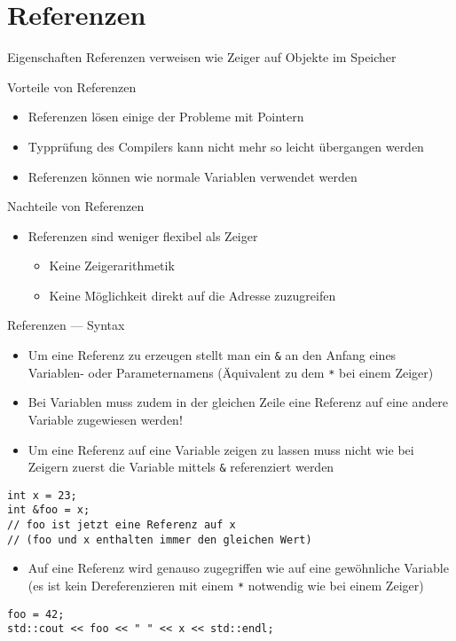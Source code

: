 \documentclass[presentation]{beamer}
\begin{document}
\section{Referenzen}
\label{sec:orgb08a8a5}
\begin{frame}[label={sec:org05eda9c}]{Eigenschaften}
Referenzen verweisen wie Zeiger auf Objekte im Speicher
\begin{block}{Vorteile von Referenzen}
\begin{itemize}
\item Referenzen lösen einige der Probleme mit Pointern
\item Typprüfung des Compilers kann nicht mehr so leicht übergangen werden
\item Referenzen können wie normale Variablen verwendet werden
\end{itemize}
\end{block}
\begin{block}{Nachteile von Referenzen}
\begin{itemize}
\item Referenzen sind weniger flexibel als Zeiger
\begin{itemize}
\item Keine Zeigerarithmetik
\item Keine Möglichkeit direkt auf die Adresse zuzugreifen
\end{itemize}
\end{itemize}
\end{block}
\end{frame}
\begin{frame}[label={sec:org058c988},fragile]{Referenzen --- Syntax}
 \begin{itemize}
\item Um eine Referenz zu erzeugen stellt man ein {\color{solarizedYellow}\verb!&!} an den Anfang eines
Variablen- oder Parameternamens (Äquivalent zu dem {\color{solarizedYellow}\verb!*!} bei einem
Zeiger)
\item \alert{Bei Variablen muss zudem in der gleichen Zeile eine Referenz auf
eine andere Variable zugewiesen werden!}
\item Um eine Referenz auf eine Variable zeigen zu lassen muss nicht wie
bei Zeigern zuerst die Variable mittels {\color{solarizedYellow}\verb!&!} referenziert werden
\end{itemize}
\begin{verbatim}
int x = 23;
int &foo = x;
// foo ist jetzt eine Referenz auf x 
// (foo und x enthalten immer den gleichen Wert)
\end{verbatim}
\begin{itemize}
\item Auf eine Referenz wird genauso zugegriffen wie auf eine gewöhnliche
Variable (es ist kein Dereferenzieren mit einem {\color{solarizedYellow}\verb!*!} notwendig wie
bei einem Zeiger)
\end{itemize}
\begin{verbatim}
foo = 42;
std::cout << foo << " " << x << std::endl;
\end{verbatim}
\end{frame}
\end{document}
